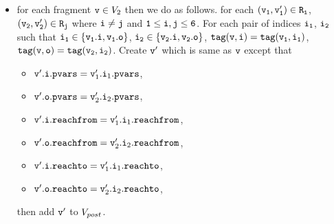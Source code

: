 \begin{itemize}
\item for each fragment $\mathtt{v} \in V_2$ then we do as follows. for each $\tt (\mathtt{v}_1,\mathtt{v}_1') \in R_i$, $\tt (\mathtt{v}_2,\mathtt{v}_2') \in R_j$ where $\tt i \neq j$ and $\tt 1 \leq i,j \leq 6$. For each pair of indices $\tt i_1$, $\tt i_2$ such that $\tt i_1 \in \{\mathtt{v}_1.i, \mathtt{v}_1.o\}$, $\tt i_2 \in \{\mathtt{v}_2.i, \mathtt{v}_2.o\}$, $\tt tag(v,i) = tag(\mathtt{v}_1, i_1)$, $\tt tag(v,o) = tag(\mathtt{v}_2, i_2)$. Create $\mathtt{v}'$ which is same as $\mathtt{v}$ except that 
\begin{itemize}
\item $\mathtt{v}'.\mathtt{i}.\mathtt{pvars} = \mathtt{v}_1'.\mathtt{i}_1.\mathtt{pvars}$,
\item $\mathtt{v}'.\mathtt{o}.\mathtt{pvars} = \mathtt{v}_2'.\mathtt{i}_2.\mathtt{pvars}$,
\item $\mathtt{v}'.\mathtt{i}.\mathtt{reachfrom} = \mathtt{v}_1'.\mathtt{i}_1.\mathtt{reachfrom}$,
\item $\mathtt{v}'.\mathtt{o}.\mathtt{reachfrom} = \mathtt{v}_2'.\mathtt{i}_2.\mathtt{reachfrom}$,
\item $\mathtt{v}'.\mathtt{i}.\mathtt{reachto} = \mathtt{v}_1'.\mathtt{i}_1.\mathtt{reachto}$,
\item $\mathtt{v}'.\mathtt{o}.\mathtt{reachto} =  \mathtt{v}_2'.\mathtt{i}_2.\mathtt{reachto}$,
\end{itemize}
then add $\tt v'$ to $V_{post}$. 


\newpage
 \end{itemize}
 
